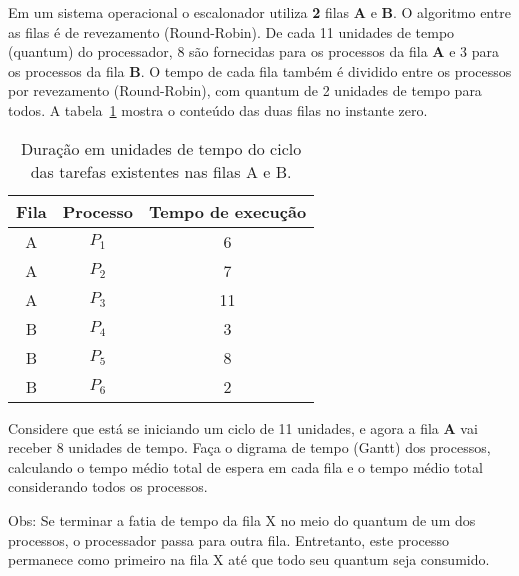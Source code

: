 \def\quantumtotal{11} \def\quantumA{8} \def\quantumB{3}
\def\quantumfila{2} \question[3,0] Em um sistema operacional o
escalonador utiliza {\bf \quantumfila{}} filas {\bf A} e {\bf B}. O
algoritmo entre as filas é de revezamento (Round-Robin). De cada
\quantumtotal{} unidades de tempo (quantum) do processador,
\quantumA{} são fornecidas para os processos da fila {\bf A} e
\quantumB{} para os processos da fila {\bf B}. O tempo de cada fila
também é dividido entre os processos por revezamento (Round-Robin),
com quantum de 2 unidades de tempo para todos. A tabela~\ref{so:sched}
mostra o conteúdo das duas filas no instante zero.

\begin{table}[h]
  \centering
  \begin{tabular}{c|c|c}\hline
    \bf Fila & \bf Processo & \bf Tempo de execução \\ \hline\hline
    A & $P_1$ & 6 \\\hline
    A & $P_2$ & 7 \\\hline
    A & $P_3$ & 11 \\\hline
    B & $P_4$ & 3 \\\hline
    B & $P_5$ & 8 \\\hline
    B & $P_6$ & 2 \\\hline
  \end{tabular}
  \caption{Duração em unidades de tempo do ciclo das tarefas existentes nas filas A e B.}
  \label{so:sched}
\end{table}


\noindent Considere que está se iniciando um ciclo de 11 unidades, e
agora a fila {\bf A} vai receber \quantumA{} unidades de tempo. Faça o digrama
de tempo (Gantt) dos processos, calculando o tempo médio total de espera em
cada fila e o tempo médio total considerando todos os processos.

\noindent Obs: Se terminar a fatia de tempo da fila X no meio do 
quantum de um dos processos, o processador passa para outra
fila. Entretanto, este processo permanece como primeiro na fila X até
que todo seu quantum seja consumido.

